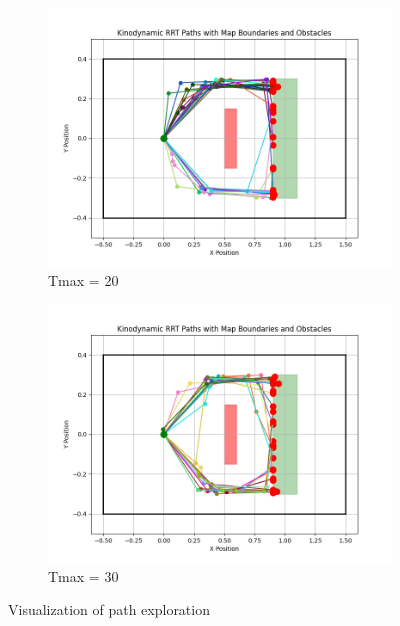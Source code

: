 \documentclass[12pt]{article}
\begin{document}
\begin{figure}[h!]
    \begin{subfigure}{0.45\textwidth}
        \centering
        \includegraphics[width=\textwidth]{./images/20.png}
        \caption{Tmax = 20}
        \label{fig:20.png}
    \end{subfigure}
    \hfill
    \begin{subfigure}{0.45\textwidth}
        \centering
        \includegraphics[width=\textwidth]{./images/30.png}
        \caption{Tmax = 30}
        \label{fig:30.png}
    \end{subfigure}

    \caption{Visualization of path exploration}
    \label{fig:Time Trails}
\end{figure}
\end{document}
